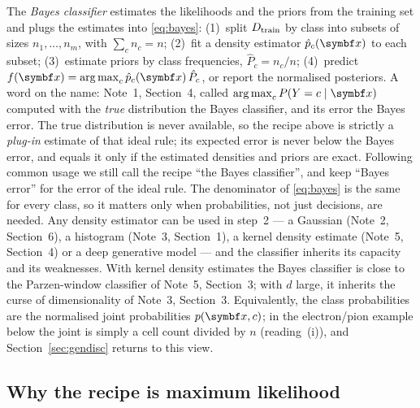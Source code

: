 \documentclass[11pt]{article}
\begin{document}
The \emph{Bayes classifier} estimates the likelihoods and the priors from the training set and plugs the estimates
into \eqref{eq:bayes}: (1)~split $D_{\mathrm{train}}$ by class into subsets of sizes $n_1, \dots, n_m$, with $\sum_c n_c = n$;
(2)~fit a density estimator $\hat p_c(\x)$ to each subset; (3)~estimate priors by class frequencies,
$\hat P_c = n_c / n$; (4)~predict $f(\x) = \argmax_c \hat p_c(\x)\, \hat P_c$, or report the normalised posteriors.
A word on the name: Note~1, Section~4, called $\argmax_c P(Y = c \mid \x)$ computed with the \emph{true} distribution
the Bayes classifier, and its error the Bayes error. The true distribution is never available, so the recipe above is
strictly a \emph{plug-in} estimate of that ideal rule; its expected error is never below the Bayes error, and
equals it only if the estimated densities and priors are exact. Following common usage we still call the recipe ``the
Bayes classifier'', and keep ``Bayes error'' for the error of the ideal rule.
The denominator of \eqref{eq:bayes} is the same for every class, so it matters only when probabilities, not just
decisions, are needed. Any density estimator can be used in step~2 --- a Gaussian (Note~2, Section~6), a histogram
(Note~3, Section~1), a kernel density estimate (Note~5, Section~4) or a deep generative model --- and the classifier
inherits its capacity and its weaknesses. With kernel density estimates the Bayes classifier is close to the
Parzen-window classifier of Note~5, Section~3; with $d$ large, it inherits the curse of dimensionality of Note~3,
Section~3. Equivalently, the class probabilities are the normalised joint probabilities $p(\x, c)$; in the
electron/pion example below the joint is simply a cell count divided by $n$ (reading~(i)), and Section~\ref{sec:gendisc}
returns to this view.

\subsection{Why the recipe is maximum likelihood}
\end{document}
